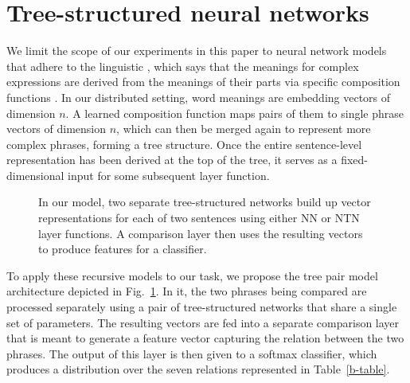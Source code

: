 
\section{Tree-structured neural networks} \label{methods}

We limit the scope of our experiments in this paper to neural network models 
that adhere to the linguistic , which says that the meanings for complex
expressions are derived from the meanings of their parts
via specific composition functions \cite{Partee84,Janssen97}. In our
distributed setting, word meanings are embedding vectors of dimension $n$. A learned
composition function maps pairs of them to single phrase vectors of dimension $n$, 
which can then be merged again to represent more complex
phrases, forming a tree structure. Once the entire sentence-level representation has been
derived at the top of the tree, it serves as a fixed-dimensional input for some subsequent layer function.

\begin{figure}[tp]
  \centering
  
  \caption{In our model, two separate tree-structured networks build up vector representations for each of two sentences using either NN or NTN layer functions. A comparison layer then uses the resulting vectors to produce features for a classifier.} 
  \label{sample-figure}
\end{figure}

To apply these recursive models to our task, we propose the tree 
pair model architecture depicted in Fig.~\ref{sample-figure}. 
In it, the two phrases being compared are processed separately using a pair 
of tree-structured networks that share a single set of parameters. 
The resulting vectors are fed into a separate comparison
layer that is meant to generate a feature vector capturing the
relation between the two phrases. The output of this layer is then
given to a softmax classifier, which produces a
distribution over the seven relations represented in Table~\ref{b-table}.

